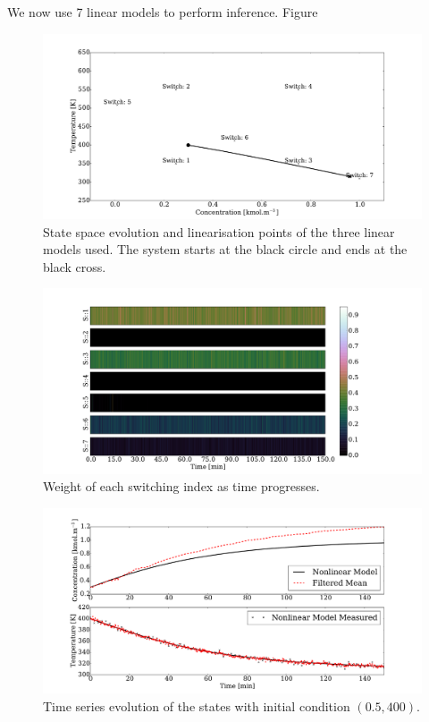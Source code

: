 \documentclass[../masters.tex]{subfiles}
\begin{document}
We now use 7 linear models to perform inference. Figure 
\begin{figure}[H] 
\centering
\includegraphics[scale=0.3]{skf_s7_s_m1.pdf}
\caption{State space evolution and linearisation points of the three linear models used. The system starts at the black circle and ends at the black cross.}
\label{fig_7mod_ss_m1}
\end{figure}
\begin{figure}[H] 
\centering
\includegraphics[scale=0.3]{skf_s7_w_m1.pdf}
\caption{Weight of each switching index as time progresses.}
\label{fig_7mod_w_m1}
\end{figure}
\begin{figure}[H] 
\centering
\includegraphics[scale=0.3]{skf_s7_t_m1.pdf}
\caption{Time series evolution of the states with initial condition $(0.5, 400)$.}
\label{fig_7mod_t_m1}
\end{figure}
\end{document}
